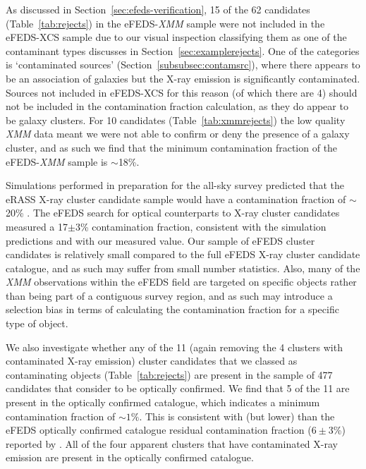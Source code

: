\documentclass[fleqn,usenatbib]{mnras}
\begin{document}
As discussed in Section~\ref{sec:efeds-verification}, 15 of the 62 candidates (Table~\ref{tab:rejects}) in the eFEDS-{\em XMM} sample were not included in the eFEDS-XCS sample due to our visual inspection classifying them as one of the contaminant types discusses in Section~\ref{sec:examplerejects}. One of the categories is `contaminated sources' (Section~\ref{subsubsec:contamsrc}), where there appears to be an association of galaxies but the X-ray emission is significantly contaminated. Sources not included in eFEDS-XCS for this reason (of which there are 4) should not be included in the contamination fraction calculation, as they do appear to be galaxy clusters. For 10 candidates (Table~\ref{tab:xmmrejects}) the low quality {\em XMM} data meant we were not able to confirm or deny the presence of a galaxy cluster, and as such we find that the minimum contamination fraction of the eFEDS-{\em XMM} sample is ${\sim}$18\%.

Simulations performed in preparation for the all-sky survey predicted that the eRASS X-ray cluster candidate sample would have a contamination fraction of $\sim$20\% \citep{simerass}. The eFEDS search for optical counterparts to X-ray cluster candidates \citep[][]{efedsclusteropticalcat} measured a 17$\pm 3$\% contamination fraction, consistent with the simulation predictions and with our measured value. Our sample of eFEDS cluster candidates is relatively small compared to the full eFEDS X-ray cluster candidate catalogue, and as such may suffer from small number statistics. Also, many of the {\em XMM} observations within the eFEDS field are targeted on specific objects rather than being part of a contiguous survey region, and as such may introduce a selection bias in terms of calculating the contamination fraction for a specific type of object.

We also investigate whether any of the 11 (again removing the 4 clusters with contaminated X-ray emission) cluster candidates that we classed as contaminating objects (Table~\ref{tab:rejects}) are present in the sample of 477 candidates that \cite{efedsclusteropticalcat} consider to be optically confirmed. We find that 5 of the 11 are present in the optically confirmed catalogue, which indicates a minimum contamination fraction of ${\sim}1\%$. This is consistent with (but lower) than the eFEDS optically confirmed catalogue residual contamination fraction ($6\pm 3$\%) reported by \cite{efedsclusteropticalcat}. All of the four apparent clusters that have contaminated X-ray emission are present in the optically confirmed catalogue.
\end{document}
